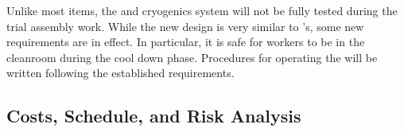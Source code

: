 Unlike most items, the \coldbox and cryogenics system will not be fully tested during the trial assembly work. While the new \coldbox design is very similar to 's, some new requirements are in effect. In particular, it is  safe for workers to be in the cleanroom during the cool down phase.  Procedures for operating the \coldbox will be written following the established requirements. 

  
\subsection{Costs, Schedule, and Risk Analysis}
\label{sec:fdsp-tc-infr-cost}


